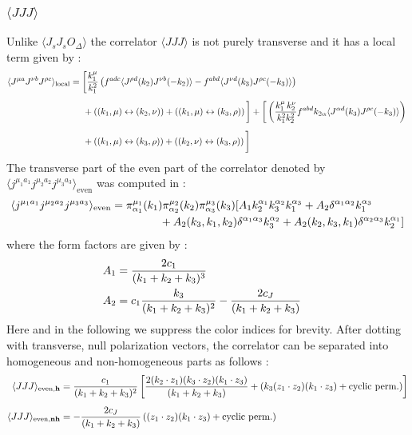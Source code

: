 \documentclass[a4paper,11pt]{article}
\begin{document}
\subsubsection*{$\langle JJJ\rangle$}
Unlike $\langle J_sJ_sO_{\Delta}\rangle$ the correlator $\langle JJJ\rangle$ is not purely transverse and it has a local term given by \cite{Bzowski:2017poo}:
\begin{align}
\label{jjjlocal}
\begin{split}
\langle J^{\mu a} J^{\nu b} J^{\rho c} \rangle_{\text{local}} &= \bigg[\frac{k_1^{\mu}}{k_1^2}\left(f^{adc}\langle J^{\rho d}(k_2)J^{\nu b}(-k_2) \rangle-f^{abd}\langle J^{\nu d}(k_3)J^{\rho c}(-k_3)\rangle\right)\bigg.\\[5 pt]
&\hspace{.5cm}\bigg.+\left((k_1, \mu) \leftrightarrow (k_2, \nu)\right)+\left((k_1, \mu) \leftrightarrow (k_3, \rho)\right)\bigg]+\bigg[\left(\frac{k_1^{\mu}\,k_2^{\nu}}{k_1^2 k_2^2}f^{abd}k_{2\alpha}\langle J^{\alpha d}(k_3)J^{\rho c}(-k_3)\rangle\right)\bigg.\\[5 pt]
&\hspace{.5cm}\bigg.+\left((k_1, \mu) \leftrightarrow (k_3, \rho)\right)+\left((k_2, \nu) \leftrightarrow (k_3, \rho)\right)\bigg]
\end{split}
\end{align}
The transverse part of the even part of the correlator denoted by $\langle j^{\mu_1a_1}j^{\mu_2a_2}j^{\mu_3a_3}\rangle_{\text{even}}$ was computed in \cite{Bzowski:2017poo} :
%
\begin{align}
  \langle j^{\mu_1a_1}j^{\mu_2a_2}j^{\mu_3a_3}\rangle_{\text{even}}=\pi^{\mu_1}_{\alpha_1}(k_1)\pi^{\mu_2}_{\alpha_2}(k_2)\pi^{\mu_3}_{\alpha_3}(k_3)[&A_1k_2^{\alpha_1}k_3^{\alpha_2}k_1^{\alpha_3}+A_2\delta^{\alpha_1\alpha_2}k_1^{\alpha_3}\notag\\
 &\hspace{-2.5cm} +A_2(k_3,k_1,k_2)\delta^{\alpha_1\alpha_3}k_3^{\alpha_2}
  +A_2(k_2,k_3,k_1)\delta^{\alpha_2\alpha_3}k_2^{\alpha_1}] 
\end{align}
where the form factors are given by :
\begin{align}
    A_1&=\frac{2c_1}{(k_1+k_2+k_3)^3}\cr
    A_2&=c_1\frac{k_3}{(k_1+k_2+k_3)^2}-\frac{2c_{J}}{(k_1+k_2+k_3)}
\end{align}
Here and in the following we suppress the color indices for brevity. After dotting with transverse, null polarization vectors, the correlator can be separated into homogeneous and non-homogeneous parts as follows :
\begin{align}
    \begin{split}
        \langle JJJ \rangle_{\text{even}, \bf{h}} &= \frac{c_1}{(k_1+k_2+k_3)^2}\left[\frac{2(k_2 \cdot z_1)(k_3 \cdot z_2)(k_1 \cdot z_3)}{(k_1+k_2+k_3)}+\left(k_3(z_1 \cdot z_2)(k_1 \cdot z_3)+\text{cyclic perm.}\right)\right]\\[5 pt]
        \langle JJJ \rangle_{\text{even}, \bf{nh}} &= -\frac{2c_J}{(k_1+k_2+k_3)}\left((z_1 \cdot z_2)(k_1 \cdot z_3) +\text{cyclic perm.}\right)
        \end{split}
\end{align}
\end{document}
